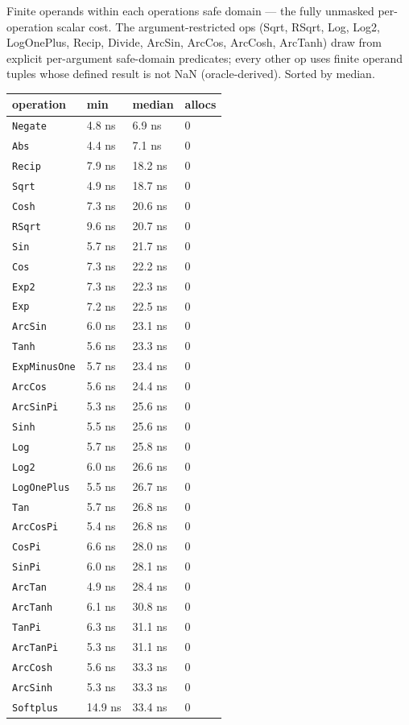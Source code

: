 Finite operands within each operation{\textquotesingle}s safe domain — the fully unmasked per-operation scalar cost. The argument-restricted ops (Sqrt, RSqrt, Log, Log2, LogOnePlus, Recip, Divide, ArcSin, ArcCos, ArcCosh, ArcTanh) draw from explicit per-argument safe-domain predicates; every other op uses finite operand tuples whose defined result is not NaN (oracle-derived). Sorted by median.




\begin{table}[h]
\centering
\nopagebreak[3]
\begin{tabulary}{\linewidth}{L L L L}
\toprule
operation & min & median & allocs \\
\toprule
\texttt{Negate} & 4.8 ns & 6.9 ns & 0 \\
\texttt{Abs} & 4.4 ns & 7.1 ns & 0 \\
\texttt{Recip} & 7.9 ns & 18.2 ns & 0 \\
\texttt{Sqrt} & 4.9 ns & 18.7 ns & 0 \\
\texttt{Cosh} & 7.3 ns & 20.6 ns & 0 \\
\texttt{RSqrt} & 9.6 ns & 20.7 ns & 0 \\
\texttt{Sin} & 5.7 ns & 21.7 ns & 0 \\
\texttt{Cos} & 7.3 ns & 22.2 ns & 0 \\
\texttt{Exp2} & 7.3 ns & 22.3 ns & 0 \\
\texttt{Exp} & 7.2 ns & 22.5 ns & 0 \\
\texttt{ArcSin} & 6.0 ns & 23.1 ns & 0 \\
\texttt{Tanh} & 5.6 ns & 23.3 ns & 0 \\
\texttt{ExpMinusOne} & 5.7 ns & 23.4 ns & 0 \\
\texttt{ArcCos} & 5.6 ns & 24.4 ns & 0 \\
\texttt{ArcSinPi} & 5.3 ns & 25.6 ns & 0 \\
\texttt{Sinh} & 5.5 ns & 25.6 ns & 0 \\
\texttt{Log} & 5.7 ns & 25.8 ns & 0 \\
\texttt{Log2} & 6.0 ns & 26.6 ns & 0 \\
\texttt{LogOnePlus} & 5.5 ns & 26.7 ns & 0 \\
\texttt{Tan} & 5.7 ns & 26.8 ns & 0 \\
\texttt{ArcCosPi} & 5.4 ns & 26.8 ns & 0 \\
\texttt{CosPi} & 6.6 ns & 28.0 ns & 0 \\
\texttt{SinPi} & 6.0 ns & 28.1 ns & 0 \\
\texttt{ArcTan} & 4.9 ns & 28.4 ns & 0 \\
\texttt{ArcTanh} & 6.1 ns & 30.8 ns & 0 \\
\texttt{TanPi} & 6.3 ns & 31.1 ns & 0 \\
\texttt{ArcTanPi} & 5.3 ns & 31.1 ns & 0 \\
\texttt{ArcCosh} & 5.6 ns & 33.3 ns & 0 \\
\texttt{ArcSinh} & 5.3 ns & 33.3 ns & 0 \\
\texttt{Softplus} & 14.9 ns & 33.4 ns & 0 \\
\bottomrule
\end{tabulary}

\end{table}
